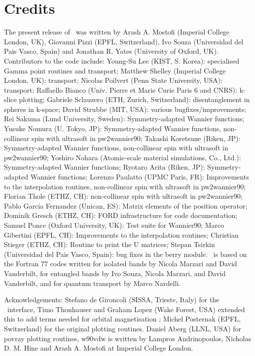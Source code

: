 \section*{Credits}
The present release of \wannier\ was written by Arash A. Mostofi
(Imperial College London, UK), Giovanni Pizzi (EPFL, Switzerland), Ivo Souza 
(Universidad del Pais Vasco, Spain) and
Jonathan R. Yates (University of
Oxford, UK). Contributors to the code include:
Young-Su Lee (KIST, S. Korea): specialised Gamma point routines and transport;
Matthew Shelley (Imperial College London, UK): transport;
Nicolas Poilvert (Penn State University, USA): transport;
Raffaello Bianco (Univ. Pierre et Marie Curie Paris 6 and CNRS):  k-slice plotting;
Gabriele Sclauzero (ETH, Zurich, Switzerland): disentanglement in spheres in k-space;
David Strubbe (MIT, USA): various bugfixes/improvements;
Rei Sakuma (Lund University, Sweden): Symmetry-adapted Wannier functions;
Yusuke Nomura (U. Tokyo, JP): Symmetry-adapted Wannier functions, non-collinear spin with ultrasoft in pw2wannier90;
Takashi Koretsune (Riken, JP): Symmetry-adapted Wannier functions, non-collinear spin with ultrasoft in pw2wannier90;
Yoshiro Nohara (Atomic-scale material simulations, Co., Ltd.): Symmetry-adapted Wannier functions;
Ryotaro Arita (Riken, JP): Symmetry-adapted Wannier functions;
Lorenzo Paulatto (UPMC Paris, FR): Improvements to the interpolation routines, non-collinear spin with ultrasoft in pw2wannier90;
Florian Thole (ETHZ, CH): non-collinear spin with ultrasoft in pw2wannier90;
Pablo Garcia Fernandez (Unican, ES): Matrix elements of the position operator;
Dominik Gresch (ETHZ, CH): FORD infrastructure for code documentation;
Samuel Ponce (Oxford University, UK): Test suite for Wannier90;
Marco Gibertini (EPFL, CH): Improvements to the interpolation routines;
Christian Stieger (ETHZ, CH): Routine to print the U matrices;
Stepan Tsirkin (Universidad del Pais Vasco, Spain): bug fixes in the berry module.
 \wannier\ is
based on the Fortran 77 codes written for isolated bands by Nicola Marzari
and David Vanderbilt, for entangled bands by Ivo Souza, Nicola Marzari,
and David Vanderbilt, and for quantum transport by Marco Nardelli.

Acknowledgements: Stefano de Gironcoli (SISSA, Trieste, Italy) for the
\pwscf\ interface, Timo Thonhauser and Graham Lopez (Wake Forest, USA) 
extended this to add terms needed for orbital magnetisation
; Michel Posternak (EPFL, Switzerland) for the
original plotting routines. Daniel Aberg (LLNL, USA) for povray plotting routines, w90vdw is written by
Lampros Andrinopoulos, Nicholas D. M. Hine and Arash A. Mostofi at Imperial College London. 

